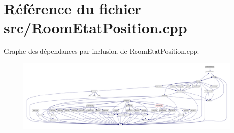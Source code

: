 \section{Référence du fichier src/\-Room\-Etat\-Position.cpp}
\label{_room_etat_position_8cpp}
Graphe des dépendances par inclusion de Room\-Etat\-Position.\-cpp\-:
\nopagebreak
\begin{figure}[H]
\begin{center}
\leavevmode
\includegraphics[width=350pt]{_room_etat_position_8cpp__incl}
\end{center}
\end{figure}
